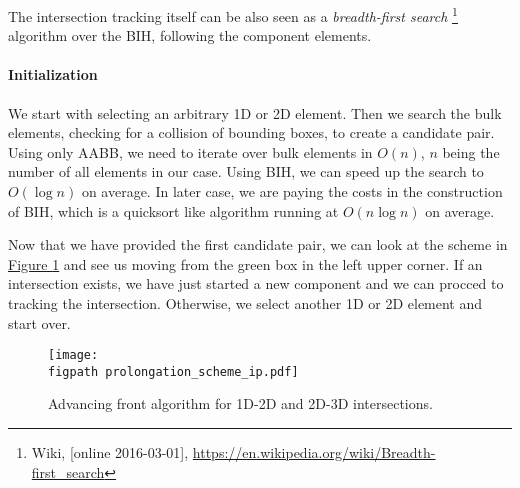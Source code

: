 \documentclass{elsarticle}
\newcommand{\fig}[1]{\hyperref[#1]{Figure \ref{#1}}}
\newcommand{\figpath}{figures/}
\begin{document}
The intersection tracking itself can be also seen as a \emph{breadth-first search}
\footnote{Wiki, [online 2016-03-01], \url{https://en.wikipedia.org/wiki/Breadth-first_search}}
algorithm over the BIH, following the component elements.


\paragraph{Initialization}
We start with selecting an arbitrary 1D or 2D element. Then we search the bulk elements, checking for 
a collision of bounding boxes, to create a candidate pair. Using only AABB, we need to iterate over
bulk elements in $O(n)$, $n$ being the number of all elements in our case. Using BIH, we can speed 
up the search to $O(\log n)$ on average. In later case, we are paying the costs in the construction of BIH,
which is a quicksort like algorithm running at $O(n\log n)$ on average.

Now that we have provided the first candidate pair, we can look at the scheme in \fig{fig:prolongation} and see us moving from the green box in the left upper corner. If an intersection exists, we have just started a new component and we can procced to tracking the intersection. Otherwise, we select another 1D or 2D element and start over.

%
\begin{figure}[!htb]
  \centering    
    \texttt{[image: \\figpath prolongation\_scheme\_ip.pdf]}
  \caption{Advancing front algorithm for 1D-2D and 2D-3D intersections.}
  \label{fig:prolongation}
\end{figure}
\end{document}
